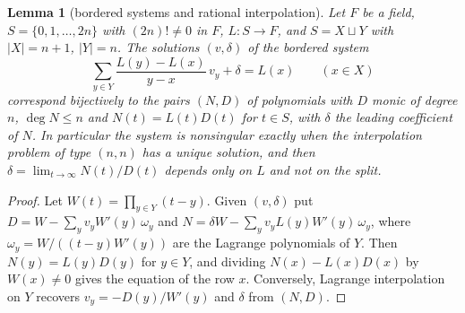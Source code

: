 \documentclass[11pt]{amsart}
\newtheorem{lemma}[theorem]{Lemma}
\theoremstyle{definition}
\theoremstyle{remark}
\numberwithin{equation}{section}
\begin{document}
\begin{lemma}[bordered systems and rational interpolation]\label{lem:interp}
Let $F$ be a field, $S=\{0,1,\dots,2n\}$ with $(2n)!\ne0$ in $F$, $L:S\to F$, and $S=X\sqcup Y$ with $|X|=n+1$, $|Y|=n$. The
solutions $(v,\delta)$ of the bordered system
\[
 \sum_{y\in Y}\frac{L(y)-L(x)}{y-x}\,v_y+\delta=L(x)\qquad(x\in X)
\]
correspond bijectively to the pairs $(N,D)$ of polynomials with $D$ monic of degree $n$, $\deg N\le n$ and $N(t)=L(t)D(t)$
for $t\in S$, with $\delta$ the leading coefficient of $N$. In particular the system is nonsingular exactly when the
interpolation problem of type $(n,n)$ has a unique solution, and then $\delta=\lim_{t\to\infty}N(t)/D(t)$ depends only on
$L$ and not on the split.
\end{lemma}
\begin{proof}
Let $W(t)=\prod_{y\in Y}(t-y)$. Given $(v,\delta)$ put $D=W-\sum_yv_yW'(y)\,\omega_y$ and
$N=\delta W-\sum_yv_yL(y)W'(y)\,\omega_y$, where $\omega_y=W/((t-y)W'(y))$ are the Lagrange polynomials of $Y$. Then
$N(y)=L(y)D(y)$ for $y\in Y$, and dividing $N(x)-L(x)D(x)$ by $W(x)\ne0$ gives the equation of the row $x$. Conversely,
Lagrange interpolation on $Y$ recovers $v_y=-D(y)/W'(y)$ and $\delta$ from $(N,D)$.
\end{proof}
\end{document}
